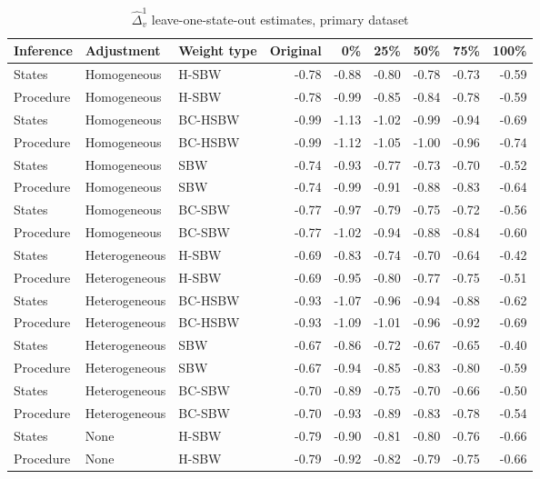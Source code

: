 \begin{table}[ht]
\centering
\label{tab:rdiffc1}
\caption{$\hat{\Delta}^1_v$ leave-one-state-out estimates, primary dataset}
\begin{tabular}{lllrrrrrr}
  \hline
Inference & Adjustment & Weight type & Original & 0\% & 25\% & 50\% & 75\% & 100\% \\ 
  \hline
States & Homogeneous & H-SBW & -0.78 & -0.88 & -0.80 & -0.78 & -0.73 & -0.59 \\ 
  Procedure & Homogeneous & H-SBW & -0.78 & -0.99 & -0.85 & -0.84 & -0.78 & -0.59 \\ 
  States & Homogeneous & BC-HSBW & -0.99 & -1.13 & -1.02 & -0.99 & -0.94 & -0.69 \\ 
  Procedure & Homogeneous & BC-HSBW & -0.99 & -1.12 & -1.05 & -1.00 & -0.96 & -0.74 \\ 
  States & Homogeneous & SBW & -0.74 & -0.93 & -0.77 & -0.73 & -0.70 & -0.52 \\ 
  Procedure & Homogeneous & SBW & -0.74 & -0.99 & -0.91 & -0.88 & -0.83 & -0.64 \\ 
  States & Homogeneous & BC-SBW & -0.77 & -0.97 & -0.79 & -0.75 & -0.72 & -0.56 \\ 
  Procedure & Homogeneous & BC-SBW & -0.77 & -1.02 & -0.94 & -0.88 & -0.84 & -0.60 \\ 
  States & Heterogeneous & H-SBW & -0.69 & -0.83 & -0.74 & -0.70 & -0.64 & -0.42 \\ 
  Procedure & Heterogeneous & H-SBW & -0.69 & -0.95 & -0.80 & -0.77 & -0.75 & -0.51 \\ 
  States & Heterogeneous & BC-HSBW & -0.93 & -1.07 & -0.96 & -0.94 & -0.88 & -0.62 \\ 
  Procedure & Heterogeneous & BC-HSBW & -0.93 & -1.09 & -1.01 & -0.96 & -0.92 & -0.69 \\ 
  States & Heterogeneous & SBW & -0.67 & -0.86 & -0.72 & -0.67 & -0.65 & -0.40 \\ 
  Procedure & Heterogeneous & SBW & -0.67 & -0.94 & -0.85 & -0.83 & -0.80 & -0.59 \\ 
  States & Heterogeneous & BC-SBW & -0.70 & -0.89 & -0.75 & -0.70 & -0.66 & -0.50 \\ 
  Procedure & Heterogeneous & BC-SBW & -0.70 & -0.93 & -0.89 & -0.83 & -0.78 & -0.54 \\ 
  States & None & H-SBW & -0.79 & -0.90 & -0.81 & -0.80 & -0.76 & -0.66 \\ 
  Procedure & None & H-SBW & -0.79 & -0.92 & -0.82 & -0.79 & -0.75 & -0.66 \\ 

\end{tabular}
\end{table}
